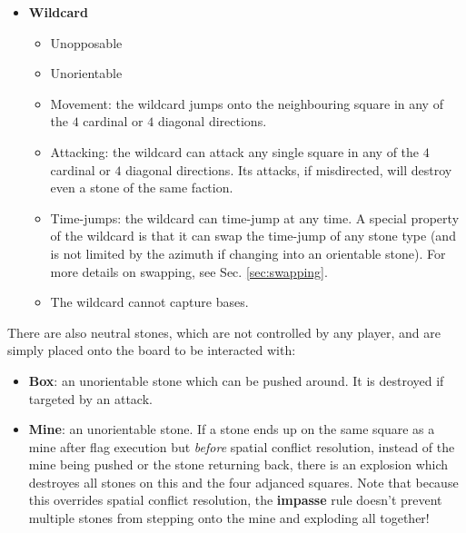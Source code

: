 \documentclass[12pt]{article}
\begin{document}
\begin{itemize}
\begin{itemize}
		\end{itemize}
	\item \textbf{Wildcard}
		\begin{itemize}
		\item Unopposable
		\item Unorientable
		\item Movement: the wildcard jumps onto the neighbouring square in any of the $4$ cardinal or $4$ diagonal directions.
		\item Attacking: the wildcard can attack any single square in any of the $4$ cardinal or $4$ diagonal directions. Its attacks, if misdirected, will destroy even a stone of the same faction.
		\item Time-jumps: the wildcard can time-jump at any time. A special property of the wildcard is that it can swap the time-jump of any stone type (and is not limited by the azimuth if changing into an orientable stone). For more details on swapping, see Sec. \ref{sec:swapping}.
		\item The wildcard cannot capture bases.
		\end{itemize}
	\end{itemize}
	There are also neutral stones, which are not controlled by any player, and are simply placed onto the board to be interacted with:
	\begin{itemize}
		\item \textbf{Box}: an unorientable stone which can be pushed around. It is destroyed if targeted by an attack.
		\item \textbf{Mine}: an unorientable stone. If a stone ends up on the same square as a mine after flag execution but \textit{before} spatial conflict resolution, instead of the mine being pushed or the stone returning back, there is an explosion which destroyes all stones on this and the four adjanced squares. Note that because this overrides spatial conflict resolution, the \textbf{impasse} rule doesn't prevent multiple stones from stepping onto the mine and exploding all together!
	\end{itemize}
	
\end{document}
